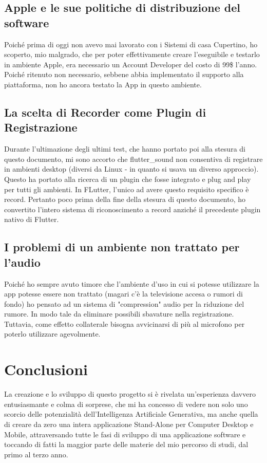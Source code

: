 \documentclass[14pt]{extbook}
\begin{document}
\section{Apple e le sue politiche di distribuzione del software}
Poiché prima di oggi non avevo mai lavorato con i Sistemi di casa Cupertino, ho scoperto, mio malgrado, che per poter effettivamente creare l'eseguibile e testarlo in ambiente Apple, era necessario un Account Developer del costo di 99\$ l'anno. Poiché ritenuto non necessario, sebbene abbia implementato il supporto alla piattaforma, non ho ancora testato la App in questo ambiente.
\pagebreak
\section{La scelta di Recorder come Plugin di Registrazione}
Durante l'ultimazione degli ultimi test, che hanno portato poi alla stesura di questo documento, mi sono accorto che flutter\_sound non consentiva di registrare in ambienti desktop (diversi da Linux - in quanto si usava un diverso approccio). Questo ha portato alla ricerca di un plugin che fosse integrato e plug and play per tutti gli ambienti. In FLutter, l'unico ad avere questo requisito specifico è record. Pertanto poco prima della fine della stesura di questo documento, ho convertito l'intero sistema di riconoscimento a record anziché il precedente plugin nativo di Flutter.
\pagebreak
\section{I problemi di un ambiente non trattato per l'audio}
Poiché ho sempre avuto timore che l'ambiente d'uso in cui si potesse utilizzare la app potesse essere non trattato (magari c'è la televisione accesa o rumori di fondo) ho pensato ad un sistema di "compression" audio per la riduzione del rumore. In modo tale da eliminare possibili sbavature nella registrazione. Tuttavia, come effetto collaterale bisogna avvicinarsi di più al microfono per poterlo utilizzare agevolmente.
\pagebreak
\clearpage
\chapter{Conclusioni}
La creazione e lo sviluppo di questo progetto si è rivelata un'esperienza davvero entusiasmante e colma di sorprese, che mi ha concesso di vedere non solo uno scorcio delle potenzialità dell'Intelligenza Artificiale Generativa, ma anche quella di creare da zero una intera applicazione Stand-Alone per Computer Desktop e Mobile, attraversando tutte le fasi di sviluppo di una applicazione software e toccando di fatti la maggior parte delle materie del mio percorso di studi, dal primo al terzo anno.\\\\
\end{document}

